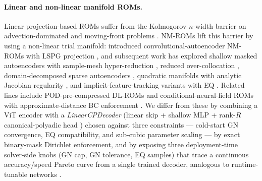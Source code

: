 \documentclass{article}
\begin{document}
\paragraph{Linear and non-linear manifold ROMs.}
Linear projection-based ROMs
\citep{BennerGugercinWillcox2015,Sirovich1987POD,Berkooz1993,QuarteroniManzoniNegri2015,HesthavenRozzaStamm2016}
suffer from the Kolmogorov $n$-width barrier on advection-dominated and
moving-front problems
\citep{CohenDeVore2015,GreifUrban2019,OhlbergerRave2016}. NM-ROMs lift
this barrier by using a non-linear trial manifold:
\citet{LeeCarlberg2020} introduced convolutional-autoencoder NM-ROMs
with LSPG projection \citep{Carlberg2011LSPG}, and subsequent work has
explored shallow masked autoencoders with sample-mesh hyper-reduction
\citep{KimChoi2022NMROM}, reduced over-collocation
\citep{RomorStabileRozza2023}, domain-decomposed sparse autoencoders
\citep{Diaz2024DomainDecompNMROM}, quadratic manifolds with analytic
Jacobian regularity \citep{GeelenWrightWillcox2022,BarnettFarhat2022},
and implicit-feature-tracking variants with EQ
\citep{MirhoseiniZahr2023}. Related lines include POD-pre-compressed
DL-ROMs \citep{FrescaManzoni2022PODDLROM} and conditional-neural-field
ROMs with approximate-distance BC enforcement
\citep{KimWenLeeChoiCNFROM2024}. We differ from these by combining a
ViT encoder \citep{Vaswani2017Attention,Dosovitskiy2021ViT} with a
\emph{LinearCPDecoder} (linear skip + shallow MLP + rank-$R$
canonical-polyadic head \citep{KoldaBader2009CP,Novikov2015TT}) chosen
against three constraints --- cold-start GN convergence, EQ
compatibility, and sub-cubic parameter scaling --- by exact binary-mask
Dirichlet enforcement, and by exposing three deployment-time
solver-side knobs (GN cap, GN tolerance, EQ samples) that trace a
continuous accuracy/speed Pareto curve from a single trained decoder,
analogous to runtime-tunable networks
\citep{YuSlimmable2019,Cai2020OnceForAll}.
\end{document}
